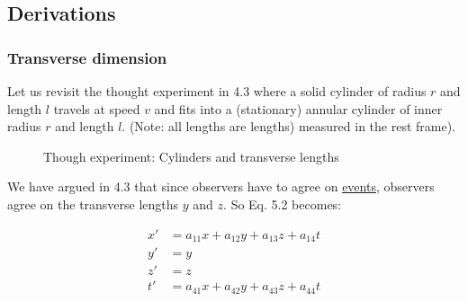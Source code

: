 \documentclass[a4paper,11pt]{article}
\numberwithin{equation}{section}
\begin{document}
 \subsection{Derivations}
 \subsubsection{Transverse dimension}
 Let us revisit the thought experiment in 4.3 where a solid cylinder of radius $r$ and length $l$ travels at speed $v$ and fits into a (stationary) annular cylinder of inner radius $r$ and length $l$. (Note: all lengths are lengths) measured in the rest frame).
 
  \begin{figure}[!htb]
 	\centering
 	\caption{Though experiment: Cylinders and transverse lengths}
 	\label{fig: transverse length thought experiment revisited}
 \end{figure}

 \noindent We have argued in 4.3 that since observers have to agree on \underline{events}, observers agree on the transverse lengths $y$ and $z$. So Eq. 5.2 becomes:
 
 \begin{equation}
 \begin{split}
 x'&=a_{11}x + a_{12}y + a_{13}z + a_{14}t \\
 y'&=y \\
 z'&=z \\
 t'&=a_{41}x + a_{42}y + a_{43}z + a_{44}t 
 \end{split}
 \end{equation}
 
\end{document}
